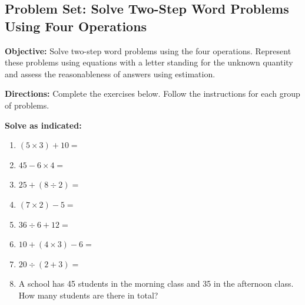 \documentclass[12pt]{article}
\title{}
\date{}
\begin{document}
\subsection*{Problem Set: Solve Two-Step Word Problems Using Four Operations}
\onehalfspacing

\begin{tcolorbox}[colframe=black!40, colback=gray!5, 
coltitle=black, colbacktitle=black!20, fonttitle=\bfseries\Large, 
title=Learning Objective, halign title=center, left=5pt, right=5pt, top=5pt, bottom=15pt]
\textbf{Objective:} Solve two-step word problems using the four operations. Represent these problems using equations with a letter standing for the unknown quantity and assess the reasonableness of answers using estimation.
\end{tcolorbox}

\begin{tcolorbox}[colframe=black!60, colback=white, 
coltitle=black, colbacktitle=black!15, fonttitle=\bfseries\Large, 
title=Exercises, halign title=center, left=10pt, right=10pt, top=10pt, bottom=60pt]
\textbf{Directions:} Complete the exercises below. Follow the instructions for each group of problems.

\textbf{Solve as indicated:}
\begin{enumerate}[itemsep=2em]
\item \( (5 \times 3) + 10 = \)
    \item \( 45 - 6 \times 4 = \)
    \item \( 25 + (8 \div 2) = \)
    \item \( (7 \times 2) - 5 = \)
    \item \( 36 \div 6 + 12 = \)
    \item \( 10 + (4 \times 3) - 6 = \)
    \item \( 20 \div (2 + 3) = \)
    \item A school has 45 students in the morning class and 35 in the afternoon class. How many students are there in total? 

\end{enumerate}
\end{tcolorbox}


\vspace{1em}
\end{document}
